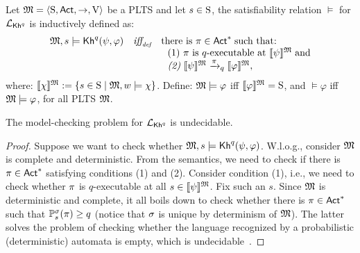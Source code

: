 \begin{definition}
    \label{def:semantic-extended}
    Let $\model = \tup{\S,\Act,\ra,\V}$ be a PLTS and let $s\in\S$, the satisfiability relation $\models$ for $\PKh$ is inductively defined as:
    \[
        \begin{array}{l@{\ \ \ }c@{\ \ \  }l}
        \model, s \models \kh^q(\psi,\varphi) & \iffdef & \text{there is } \plan \in \Act^* \;\text{such that:} \\
        & & \ \ \text{\rm (1)} \ \plan \text{ is $q$-executable at }  \truthset{\model}{\psi}\; \text{and} \\
        & & \ \ \text{\em (2)} \ \truthset{\model}{\psi} \reach{\plan}_q \truthset{\model}{\varphi}, 
        \end{array}
        \] 
        where: $\truthset{\model}{\chi} := \csetsc{s\in\S}{\model,w\models\chi}$. Define: $\model\models\varphi$ iff  $\truthset{\model}{\varphi}=\S$, and $\models\varphi$ iff $\model\models\varphi$, for all PLTS $\model$.
\end{definition}

\begin{theorem}\label{th:mc-khp-undecidable}
The model-checking problem for $\PKh$ is undecidable.
\end{theorem}

\begin{proof}
    Suppose we want to check whether $\model,s\models\kh^q(\psi,\varphi)$.  W.l.o.g., consider $\model$ is complete and deterministic. 
    From the semantics, we need to check if there is $\plan\in\Act^*$ satisfying conditions (1) and (2). Consider condition (1), i.e., we need to check whether $\plan$ is $q$-executable at all $s\in\truthset{\model}{\psi}$. Fix such an $s$. Since $\model$ is deterministic and complete, it all boils down to check whether there is $\plan\in\Act^*$ such that $\Prob^\strat_s(\plan)\geq q$ (notice that $\strat$ is unique by determinism of $\model$). 
    The latter solves the problem of checking whether the language recognized by a probabilistic (deterministic) automata is empty, which is undecidable~\cite{MadaniHC99}. 
\end{proof}


